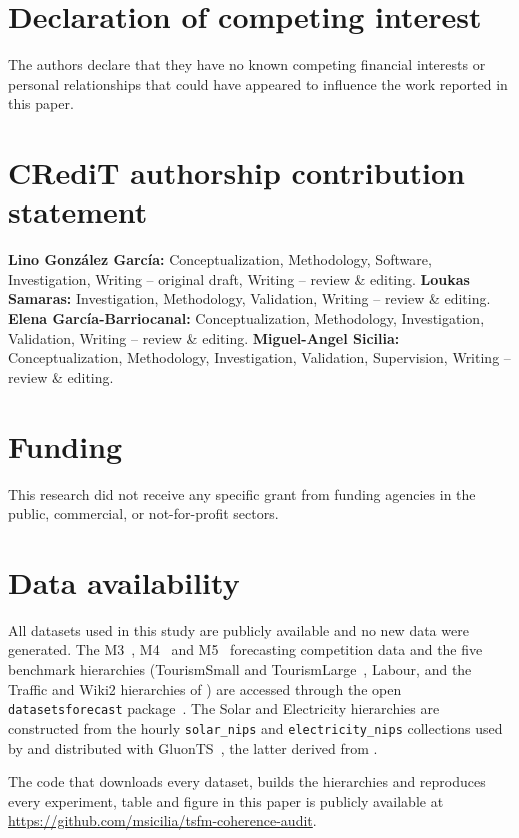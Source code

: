 \documentclass[review,number]{elsarticle}
\begin{document}
\section*{Declaration of competing interest}
The authors declare that they have no known competing financial interests or
personal relationships that could have appeared to influence the work reported in
this paper.

\section*{CRediT authorship contribution statement}
\textbf{Lino González García:} Conceptualization, Methodology, Software,
Investigation, Writing -- original draft, Writing -- review \& editing.
\textbf{Loukas Samaras:} Investigation, Methodology, Validation, Writing -- review \&
editing. \textbf{Elena García-Barriocanal:} Conceptualization, Methodology,
Investigation, Validation, Writing -- review \& editing. \textbf{Miguel-Angel
Sicilia:} Conceptualization, Methodology, Investigation, Validation, Supervision,
Writing -- review \& editing.

\section*{Funding}
This research did not receive any specific grant from funding agencies in the public,
commercial, or not-for-profit sectors.

\section*{Data availability}
All datasets used in this study are publicly available and no new data were generated.
The M3~\citep{data_m3}, M4~\citep{data_m4} and M5~\citep{data_m5} forecasting
competition data and the five benchmark hierarchies (TourismSmall and
TourismLarge~\citep{data_tourism,hyndman2011,mint2019}, Labour, and the Traffic and Wiki2
hierarchies of \citet{bentaieb2019erm}) are accessed
through the open
\texttt{datasetsforecast} package~\citep{datasetsforecast}. The Solar and Electricity hierarchies are constructed
from the hourly \texttt{solar\_nips} and \texttt{electricity\_nips} collections used
by \citet{salinas2019gpcopula} and distributed with GluonTS~\citep{gluonts2020}, the
latter derived from \citet{data_electricity}.

The code that downloads every dataset, builds the hierarchies and reproduces every
experiment, table and figure in this paper is publicly available at
\url{https://github.com/msicilia/tsfm-coherence-audit}.



\end{document}
